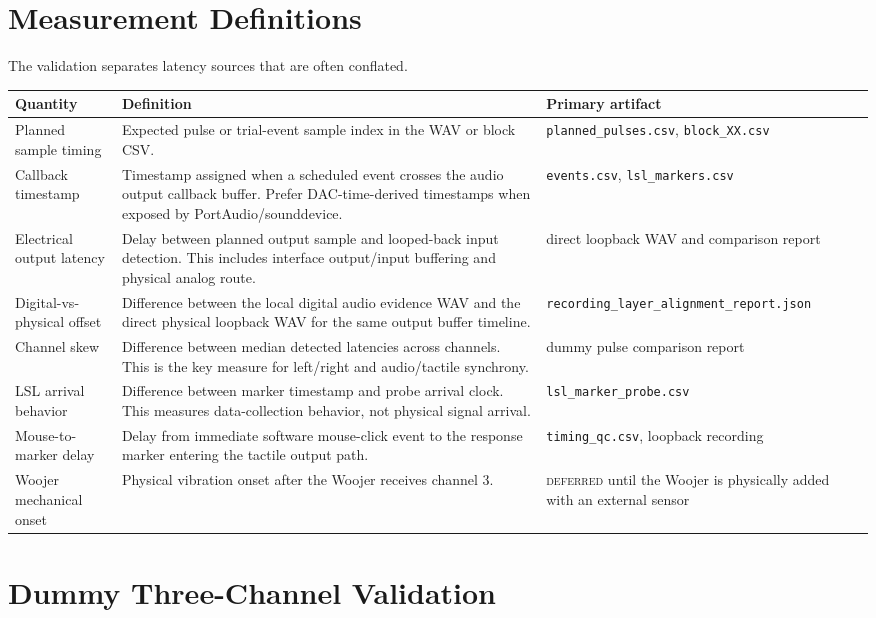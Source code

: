 \documentclass[11pt]{article}
\newcommand{\deferred}{\textsc{deferred}}
\begin{document}
\section{Measurement Definitions}

The validation separates latency sources that are often conflated.

\begin{longtable}{|p{}|p{}|p{}|}
\hline
\textbf{Quantity} & \textbf{Definition} & \textbf{Primary artifact} \\
\hline
Planned sample timing & Expected pulse or trial-event sample index in the WAV
or block CSV. & \texttt{planned\_pulses.csv},
\texttt{block\_XX.csv} \\
\hline
Callback timestamp & Timestamp assigned when a scheduled event crosses the
audio output callback buffer. Prefer DAC-time-derived timestamps when exposed
by PortAudio/sounddevice. & \texttt{events.csv},
\texttt{lsl\_markers.csv} \\
\hline
Electrical output latency & Delay between planned output sample and looped-back
input detection. This includes interface output/input buffering and physical
analog route. & direct loopback WAV and comparison report \\
\hline
Digital-vs-physical offset & Difference between the local digital audio evidence
WAV and the direct physical loopback WAV for the same output buffer timeline. &
\texttt{recording\_layer\_alignment\_report.json} \\
\hline
Channel skew & Difference between median detected latencies across channels.
This is the key measure for left/right and audio/tactile synchrony. & dummy
pulse comparison report \\
\hline
LSL arrival behavior & Difference between marker timestamp and probe arrival
clock. This measures data-collection behavior, not physical signal arrival. &
\texttt{lsl\_marker\_probe.csv} \\
\hline
Mouse-to-marker delay & Delay from immediate software mouse-click event to the
response marker entering the tactile output path. & \texttt{timing\_qc.csv},
loopback recording \\
\hline
Woojer mechanical onset & Physical vibration onset after the Woojer receives
channel 3. & \deferred{} until the Woojer is physically added with an external
sensor \\
\hline
\end{longtable}

\section{Dummy Three-Channel Validation}
\end{document}
